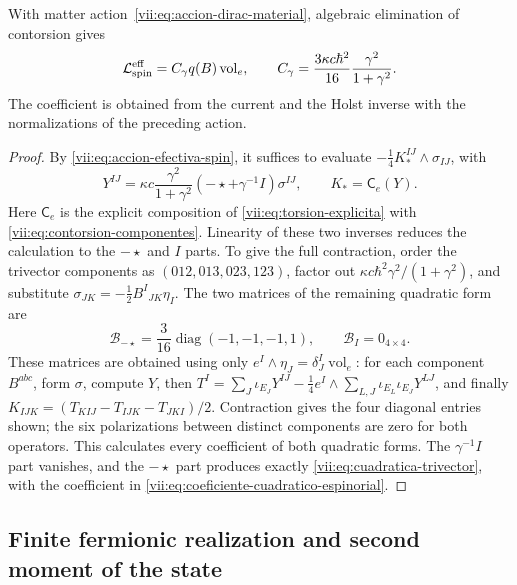 \begin{theorem}
\label{vii:thm:coeficiente-torsional-espinorial}
With matter action~\eqref{vii:eq:accion-dirac-material}, algebraic
elimination of contorsion gives
\begin{equation}
 \mathcal L_{\rm spin}^{\rm eff}
 =C_\gamma q(B)\operatorname{vol}_e,\qquad
 C_\gamma=\frac{3\kappa c\hbar^2}{16}
                      \frac{\gamma^2}{1+\gamma^2}.
 \label{vii:eq:coeficiente-cuadratico-espinorial}
\end{equation}
The coefficient is obtained from the current and the Holst inverse
with the normalizations of the preceding action.
\end{theorem}
\begin{proof}
By \eqref{vii:eq:accion-efectiva-spin}, it suffices to evaluate
\(-\frac14K_*^{IJ}\wedge\sigma_{IJ}\), with
\[
 Y^{IJ}=\kappa c\frac{\gamma^2}{1+\gamma^2}
           (-\star+\gamma^{-1}I)\sigma^{IJ},\qquad
 K_*=\mathsf C_e(Y).
\]
Here \(\mathsf C_e\) is the explicit composition of
\eqref{vii:eq:torsion-explicita} with
\eqref{vii:eq:contorsion-componentes}. Linearity of these two
inverses reduces the calculation to the \(-\star\) and \(I\)
parts. To give the full contraction, order the trivector components
as \((012,013,023,123)\), factor out
\(\kappa c\hbar^2\gamma^2/(1+\gamma^2)\), and substitute
\(\sigma_{JK}=-\frac12B^I{}_{JK}\eta_I\). The two matrices
of the remaining quadratic form are
\begin{equation}
 \mathcal B_{-\star}
 =\frac3{16}\operatorname{diag}(-1,-1,-1,1),\qquad
 \mathcal B_I=0_{4\times4}.
 \label{vii:eq:matrices-contraccion-espinorial}
\end{equation}
These matrices are obtained using only
\(e^I\wedge\eta_J=\delta_J^I\operatorname{vol}_e\): for
each component \(B^{abc}\), form \(\sigma\), compute
\(Y\), then
\(T^I=\sum_J\iota_{E_J}Y^{IJ}
 -\frac14e^I\wedge\sum_{L,J}\iota_{E_L}\iota_{E_J}Y^{LJ}\),
and finally
\(K_{IJK}=(T_{KIJ}-T_{IJK}-T_{JKI})/2\).
Contraction gives the four diagonal entries shown; the six
polarizations between distinct components are zero for both operators.
This calculates every coefficient of both quadratic forms. The
\(\gamma^{-1}I\) part vanishes, and the
\(-\star\) part produces exactly \eqref{vii:eq:cuadratica-trivector},
with the coefficient in \eqref{vii:eq:coeficiente-cuadratico-espinorial}.
\end{proof}

\subsection{Finite fermionic realization and second moment of the state}
\label{vii:subsec:segundo-momento-car}

